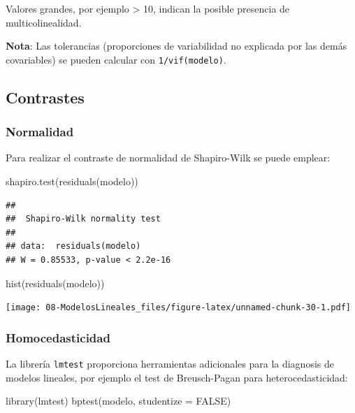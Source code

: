 \documentclass[
]{book}
\newenvironment{Shaded}{\begin{snugshade}}{\end{snugshade}}
\newcommand{\AttributeTok}[1]{\textcolor[rgb]{0.77,0.63,0.00}{#1}}
\newcommand{\ConstantTok}[1]{\textcolor[rgb]{0.00,0.00,0.00}{#1}}
\newcommand{\FunctionTok}[1]{\textcolor[rgb]{0.00,0.00,0.00}{#1}}
\newcommand{\NormalTok}[1]{#1}
\theoremstyle{break}
\begin{document}
Valores grandes, por ejemplo \textgreater{} 10, indican la posible presencia de multicolinealidad.

\textbf{Nota}: Las tolerancias (proporciones de variabilidad no explicada por las demás covariables) se pueden calcular con \texttt{1/vif(modelo)}.

\hypertarget{contrastes-1}{%
\subsection{Contrastes}\label{contrastes-1}}

\hypertarget{normalidad-1}{%
\subsubsection{Normalidad}\label{normalidad-1}}

Para realizar el contraste de normalidad de Shapiro-Wilk se puede emplear:

\begin{Shaded}
\begin{Highlighting}[]
\FunctionTok{shapiro.test}\NormalTok{(}\FunctionTok{residuals}\NormalTok{(modelo))}
\end{Highlighting}
\end{Shaded}

\begin{verbatim}
## 
##  Shapiro-Wilk normality test
## 
## data:  residuals(modelo)
## W = 0.85533, p-value < 2.2e-16
\end{verbatim}

\begin{Shaded}
\begin{Highlighting}[]
\FunctionTok{hist}\NormalTok{(}\FunctionTok{residuals}\NormalTok{(modelo))}
\end{Highlighting}
\end{Shaded}

\texttt{[image: 08-ModelosLineales\_files/figure-latex/unnamed-chunk-30-1.pdf]}

\hypertarget{homocedasticidad}{%
\subsubsection{Homocedasticidad}\label{homocedasticidad}}

La librería \texttt{lmtest} proporciona herramientas adicionales para la diagnosis de modelos lineales, por ejemplo el test de Breusch-Pagan para heterocedasticidad:

\begin{Shaded}
\begin{Highlighting}[]
\FunctionTok{library}\NormalTok{(lmtest)}
\FunctionTok{bptest}\NormalTok{(modelo, }\AttributeTok{studentize =} \ConstantTok{FALSE}\NormalTok{)}
\end{Highlighting}
\end{Shaded}
\end{document}
